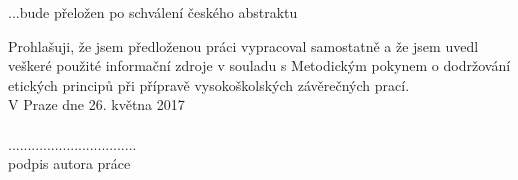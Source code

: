 \begin{abstract-english}
    ...bude přeložen po schválení českého abstraktu
\end{abstract-english}
\begin{declaration}
Prohlašuji, že jsem předloženou práci
vypracoval samostatně a že jsem uvedl
veškeré použité informační zdroje v
souladu s Metodickým pokynem o
dodržování etických principů při přípravě
vysokoškolských závěrečných prací. \\
V Praze dne 26. května 2017 \\ \\
.................................\\
podpis autora práce
\end{declaration}



